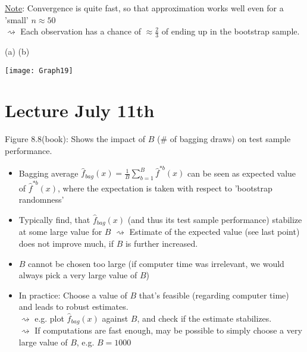 \documentclass[11pt,a4paper,numbers=endperiod]{scrartcl}
\newcommand{\tit}[1]{\begin{large} \underline{\text{#1}}\end{large}}
\begin{document}
{\underline{Note}: Convergence is quite fast, so that approximation works well even for a 'small' $n \approx 50$\\
$\rightsquigarrow$ Each observation has a chance of $\approx \frac{2}{3}$ of ending up in the bootstrap sample.\\

\tit{Exercise 8.4/4}

(a)  \hspace*{35mm}  (b)\\

\texttt{[image: Graph19]}

\section{Lecture July 11th}

Figure 8.8(book): Shows the impact of $B$ (\# of bagging draws) on test sample performance. \begin{itemize}
	\item Bagging average $\hat{f}_{bag}(x) = \frac{1}{B} \sum\limits_{b = 1}^B \hat{f}^{*b}(x)$ can be seen as expected value of $\hat{f}^{*b}(x)$, where the expectation is taken with respect to 'bootstrap randomness' 
	\item Typically find, that $\hat{f}_{bag}(x)$ (and thus its test sample performance) stabilize at some large value for $B$ $\rightsquigarrow$ Estimate of the expected value (see last point) does not improve much, if $B$ is further increased. 
	\item  $B$ cannot be chosen too large (if computer time was irrelevant, we would always pick a very large value of $B$) 
	\item In practice: Choose a value of $B$ that's feasible (regarding computer time) and leads to robust estimates.\\
	$\rightsquigarrow$ e.g. plot $\hat{f}_{bag}(x)$ against $B$, and check if the estimate stabilizes.\\
	$\rightsquigarrow$ If computations are fast enough, may be possible to simply choose a very large value of $B$, e.g. $B = 1000$ 
\end{itemize}

}
\end{document}
